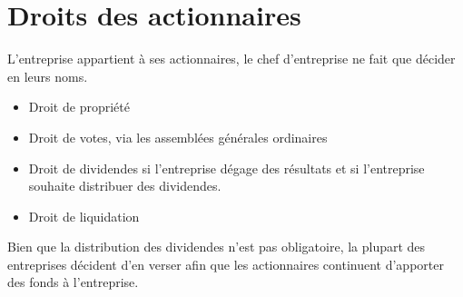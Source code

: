 \chapter{Droits des actionnaires}
L'entreprise appartient à ses actionnaires, le chef d'entreprise ne fait que décider en leurs noms.
\begin{itemize}
	\item Droit de propriété
	\item Droit de votes, via les assemblées générales ordinaires
	\item Droit de dividendes si l'entreprise dégage des résultats et si l'entreprise souhaite distribuer des dividendes.
	\item Droit de liquidation
\end{itemize}

\begin{remarque}
	Bien que la distribution des dividendes n'est pas obligatoire, la plupart des entreprises décident d'en
	verser afin que les actionnaires continuent d'apporter des fonds à l'entreprise.
\end{remarque}
